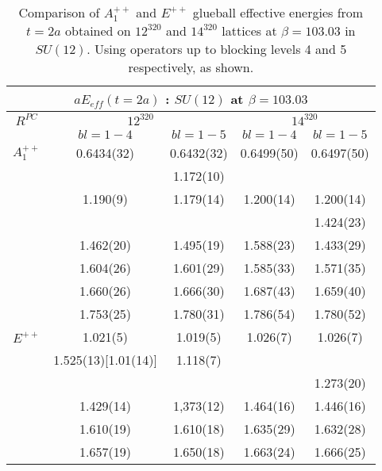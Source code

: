 \documentclass[12pt]{article}
\begin{document}
\begin{table}[htb]
\centering
\begin{tabular}{|c|cc|cc|} \hline
\multicolumn{5}{|c|}{$aE_{eff}(t=2a)$ : $SU(12)$ at $\beta=103.03$} \\ \hline
$R^{PC}$   & \multicolumn{2}{|c|}{$12^320$} &  \multicolumn{2}{|c|}{$14^320$} \\ 
          & $bl=1-4$  &  $bl=1-5$   &  $bl=1-4$  &  $bl=1-5$ \\ \hline 
$A_1^{++}$ & 0.6434(32) & 0.6432(32) & 0.6499(50) & 0.6497(50)  \\
          &            & 1.172(10)  &            &           \\
          & 1.190(9)   & 1.179(14)  & 1.200(14)  & 1.200(14) \\
          &            &            &            & 1.424(23) \\ 
          & 1.462(20)  & 1.495(19)  & 1.588(23)  & 1.433(29) \\ 
          & 1.604(26)  & 1.601(29)  & 1.585(33)  & 1.571(35) \\
          & 1.660(26)  & 1.666(30)  & 1.687(43)  & 1.659(40) \\ 
          & 1.753(25)  & 1.780(31)  & 1.786(54)  & 1.780(52) \\ \hline 
$E^{++}$   & 1.021(5)    & 1.019(5)  & 1.026(7)   & 1.026(7) \\
          & 1.525(13)[1.01(14)] & 1.118(7)  &    &          \\
          &             &           &            & 1.273(20) \\
          & 1.429(14)   & 1,373(12)  &  1.464(16)  & 1.446(16) \\
          & 1.610(19)   & 1.610(18)  &  1.635(29)  & 1.632(28) \\
          & 1.657(19)   & 1.650(18)  &  1.663(24)  & 1.666(25) \\ \hline 
\end{tabular}
\caption{Comparison of $A_1^{++}$ and $E^{++}$ glueball effective energies from $t=2a$  
  obtained on $12^320$ and $14^320$ lattices at $\beta=103.03$ in $SU(12)$.
  Using operators up to blocking levels 4 and 5 respectively, as shown.}
\label{table_GvsV_SU12B}
\end{table}
\end{document}
